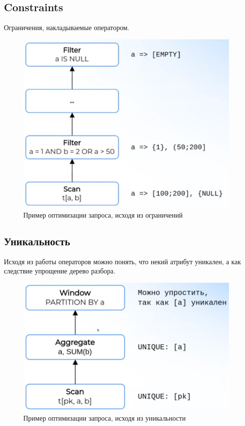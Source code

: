 \documentclass[11pt]{article}
\begin{document}
    \newpage

    \subsection*{Constraints}

    Ограничения, накладываемые оператором.

    \begin{figure}[h!]
        \centering
        \includegraphics[width=\textwidth]{Pictures/Metadata/Рассчёт ограничений}
        \caption{Пример оптимизации запроса, исходя из ограничений}
        \label{fig:constraints}
    \end{figure}

    \newpage

    \subsection*{Уникальность}

    Исходя из работы операторов можно понять, что некий атрибут уникален, а как следствие упрощение дерево разбора.

    \begin{figure}[h!]
        \centering
        \includegraphics[width=\textwidth]{Pictures/Metadata/Рассчёт уникальности}
        \caption{Пример оптимизации запроса, исходя из уникальности}
        \label{fig:unique}
    \end{figure}
\end{document}

